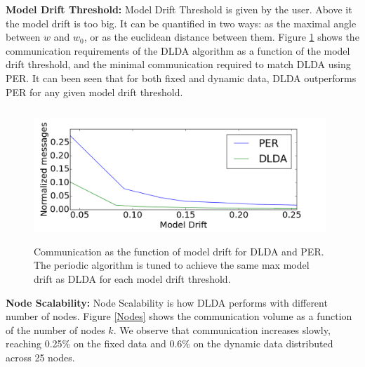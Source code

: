\documentclass{vldb}
\begin{document}
\noindent\textbf{Model Drift Threshold:} Model Drift Threshold is given by the user. Above it the model drift is too big. It can be quantified in two ways: as the maximal angle between $w$ and $w_0$, or as the euclidean distance between them. 
Figure \ref{PERvsDLDAoverError} shows the communication requirements of the DLDA algorithm as a function of the model drift threshold, and the minimal communication required to match DLDA using PER.	
It can been seen that for both fixed and dynamic data, DLDA outperforms PER for
any given model drift threshold.
 \begin{figure}
	\centering
	\includegraphics[width=110mm, height=5cm]{graphics/onlyDrift.png}
	\caption{Communication as the function of model drift for DLDA and PER. The
	periodic algorithm is tuned to achieve the same max model drift as DLDA
	for each model drift threshold.}
	\label{PERvsDLDAoverError}
\end{figure}

	
\noindent\textbf{Node Scalability:}
Node Scalability is how DLDA performs with different number of nodes.
Figure \ref{Nodes} shows the communication volume as a function of the number of nodes $k$.
We observe that communication increases slowly, reaching 0.25\% on the fixed
data and 0.6\% on the dynamic data distributed across 25 nodes.
\end{document}
